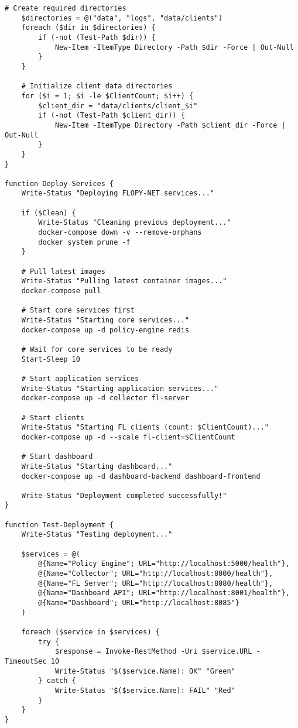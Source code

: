 \begin{lstlisting}[style=dockercode, caption=PowerShell Deployment Script]
    # Create required directories
    $directories = @("data", "logs", "data/clients")
    foreach ($dir in $directories) {
        if (-not (Test-Path $dir)) {
            New-Item -ItemType Directory -Path $dir -Force | Out-Null
        }
    }
    
    # Initialize client data directories
    for ($i = 1; $i -le $ClientCount; $i++) {
        $client_dir = "data/clients/client_$i"
        if (-not (Test-Path $client_dir)) {
            New-Item -ItemType Directory -Path $client_dir -Force | Out-Null
        }
    }
}

function Deploy-Services {
    Write-Status "Deploying FLOPY-NET services..."
    
    if ($Clean) {
        Write-Status "Cleaning previous deployment..."
        docker-compose down -v --remove-orphans
        docker system prune -f
    }
    
    # Pull latest images
    Write-Status "Pulling latest container images..."
    docker-compose pull
    
    # Start core services first
    Write-Status "Starting core services..."
    docker-compose up -d policy-engine redis
    
    # Wait for core services to be ready
    Start-Sleep 10
    
    # Start application services
    Write-Status "Starting application services..."
    docker-compose up -d collector fl-server
    
    # Start clients
    Write-Status "Starting FL clients (count: $ClientCount)..."
    docker-compose up -d --scale fl-client=$ClientCount
    
    # Start dashboard
    Write-Status "Starting dashboard..."
    docker-compose up -d dashboard-backend dashboard-frontend
    
    Write-Status "Deployment completed successfully!"
}

function Test-Deployment {
    Write-Status "Testing deployment..."
    
    $services = @(
        @{Name="Policy Engine"; URL="http://localhost:5000/health"},
        @{Name="Collector"; URL="http://localhost:8000/health"},
        @{Name="FL Server"; URL="http://localhost:8080/health"},
        @{Name="Dashboard API"; URL="http://localhost:8001/health"},
        @{Name="Dashboard"; URL="http://localhost:8085"}
    )
    
    foreach ($service in $services) {
        try {
            $response = Invoke-RestMethod -Uri $service.URL -TimeoutSec 10
            Write-Status "$($service.Name): OK" "Green"
        } catch {
            Write-Status "$($service.Name): FAIL" "Red"
        }
    }
}


\end{lstlisting}
